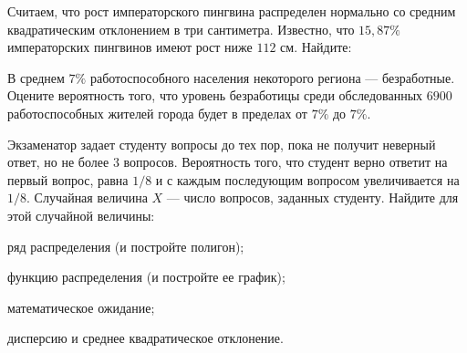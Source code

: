 \vfil

\begin{zkrPlain}{25}\noindent 
	Считаем, что рост императорского пингвина распределен нормально со средним квадратическим отклонением в три сантиметра. Известно, что $15{,}87\%$ императорских пингвинов имеют рост ниже $112$ см. Найдите: \par {}
 
\end{zkrPlain}

\vfil

\begin{zkrPlain}{25}\noindent 
	В среднем $ 7 \% $ работоспособного населения некоторого региона --- безработные. Оцените вероятность того, что уровень безработицы среди обследованных $ 6900 $ работоспособных жителей города будет в пределах от $ 7 \% $ до $ 7 \% $.
 
\end{zkrPlain}

\newpage\setcounter{zad}{0}\setcounter{footnote}{0}



\begin{zkrPlain}{25}\noindent 
	Экзаменатор задает студенту вопросы до тех пор, пока не получит неверный ответ, но не более 3 вопросов. Вероятность того, что студент верно ответит на первый вопрос, равна $1/8$ и с каждым последующим вопросом увеличивается на $1/8$. Случайная величина $X$ --- число вопросов, заданных студенту.  Найдите для этой случайной величины: \par \smallskip\small{ \par \zz ряд распределения (и постройте полигон); \par \zz функцию распределения (и постройте ее график); \par \zz математическое ожидание; \par \zz дисперсию и среднее квадратическое отклонение.\par \par}
 
\end{zkrPlain}

\vfil

